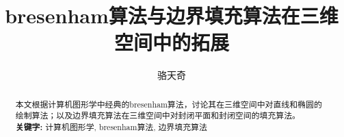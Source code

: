 \documentclass{article}
\title{bresenham算法与边界填充算法在三维空间中的拓展}
\author{骆天奇}
\date{}
\begin{document}
	\maketitle
	\begin{abstract}
		本文根据计算机图形学中经典的bresenham算法，讨论其在三维空间中对直线和椭圆的绘制算法；以及边界填充算法在三维空间中对封闭平面和封闭空间的填充算法。\\
		\textbf{关键字:} 计算机图形学, bresenham算法, 边界填充算法
	\end{abstract}
	
	
	
\end{document}
